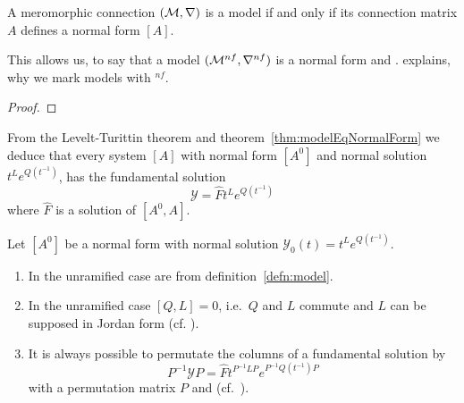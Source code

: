 \begin{thm}\label{thm:modelEqNormalForm}
  A meromorphic connection $(\mathcal{M},\nabla)$ is a model if and only if its
  connection matrix $A$ defines a normal form $[A]$.
  \begin{s-rem}
    This allows us, to say that a model $(\mathcal{M}^{nf},\nabla^{nf})$ is a normal
    form and .
     explains, why we mark models with ${}^{nf}$.
  \end{s-rem}
\end{thm}
\begin{proof}
  \TODO{}
\end{proof}
\begin{cor}
  From the Levelt-Turittin theorem and theorem~\ref{thm:modelEqNormalForm} we
  deduce that every system $[A]$ with normal form $[A^0]$ and normal solution
  $t^L e^{Q(t^{-1})}$, has the fundamental solution
  \[
    \mathcal{Y}=\hat F t^L e^{Q(t^{-1})}
  \]
  where $\hat F$ is a solution of $[A^0,A]$.
\end{cor}

\begin{rem}
  Let $[A^0]$ be a normal form with normal solution
  $\mathcal{Y}_0(t)=t^L e^{Q(t^{-1})}$.
  \begin{enumerate}
    \item In the unramified case are  from definition~\ref{defn:model}.
    \item In the unramified case
      $[Q,L]=0$, i.e.\ $Q$ and $L$ commute and $L$
      can be supposed in Jordan form (cf.  \cite[Sec.4]{Martinet1991}).
    \item It is always possible to permutate the columns of a fundamental
      solution by
      \[
        P^{-1}\mathcal{Y}P=\hat F t^{P^{-1}LP} e^{P^{-1}Q(t^{-1})P}
      \]
      with a permutation matrix $P$ and  (cf.\ \cite[73]{Loday2014}).
  \end{enumerate}
\end{rem}
\begin{comment}
  \begin{lem}
    Let $\triangle$ be a system with fundamental solution
    $\mathcal{Y}_0(t)=t^L e^{Q(t^{-1})}$ then is the matrix
    ${A^0}:=dQ+L\frac{dt}{t}$ is a connection matrix for $\triangle$.
  \TODO[\textbf{Only} in the unramified/simple case?]
  \TODO[Therefore it is obtained from $A^0$ via an isotropy?]
  \end{lem}
\end{comment}


